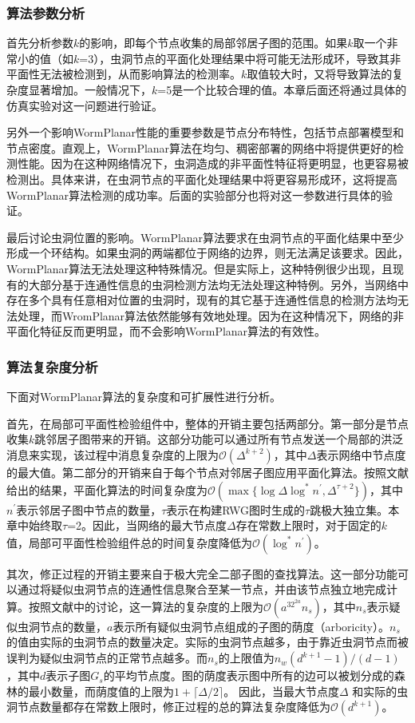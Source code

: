 \subsubsection{算法参数分析}
首先分析参数$k$的影响，即每个节点收集的局部邻居子图的范围。如果$k$取一个非常小的值（如$k$=3），虫洞节点的平面化处理结果中将可能无法形成环，导致其非平面性无法被检测到，从而影响算法的检测率。$k$取值较大时，又将导致算法的复杂度显著增加。一般情况下，$k$=5是一个比较合理的值。本章后面还将通过具体的仿真实验对这一问题进行验证。

另外一个影响WormPlanar性能的重要参数是节点分布特性，包括节点部署模型和节点密度。直观上，WormPlanar算法在均匀、稠密部署的网络中将提供更好的检测性能。因为在这种网络情况下，虫洞造成的非平面性特征将更明显，也更容易被检测出。具体来讲，在虫洞节点的平面化处理结果中将更容易形成环，这将提高WormPlanar算法检测的成功率。后面的实验部分也将对这一参数进行具体的验证。

最后讨论虫洞位置的影响。WormPlanar算法要求在虫洞节点的平面化结果中至少形成一个环结构。如果虫洞的两端都位于网络的边界，则无法满足该要求。因此，WormPlanar算法无法处理这种特殊情况。但是实际上，这种特例很少出现，且现有的大部分基于连通性信息的虫洞检测方法均无法处理这种特例。另外，当网络中存在多个具有任意相对位置的虫洞时，现有的其它基于连通性信息的检测方法均无法处理，而WromPlanar算法依然能够有效地处理。因为在这种情况下，网络的非平面化特征反而更明显，而不会影响WormPlanar算法的有效性。

\subsubsection{算法复杂度分析}
下面对WormPlanar算法的复杂度和可扩展性进行分析。

首先，在局部可平面性检验组件中，整体的开销主要包括两部分。第一部分是节点收集$k$跳邻居子图带来的开销。这部分功能可以通过所有节点发送一个局部的洪泛消息来实现，该过程中消息复杂度的上限为$\mathcal{O}(\Delta^{k+2})$，其中$\Delta$表示网络中节点度的最大值。第二部分的开销来自于每个节点对邻居子图应用平面化算法。按照文献给出的结果，平面化算法的时间复杂度为$\mathcal{O}(\max\{\log\Delta\log^*n^{'},\Delta^{\tau+2}\})$，其中$n^{'}$表示邻居子图中节点的数量，$\tau$表示在构建RWG图时生成的$\tau$跳极大独立集。本章中始终取$\tau$=2。因此，当网络的最大节点度$\Delta$存在常数上限时，对于固定的$k$值，局部可平面性检验组件总的时间复杂度降低为$\mathcal{O}(\log^*n^{'})$。

其次，修正过程的开销主要来自于极大完全二部子图的查找算法。这一部分功能可以通过将疑似虫洞节点的连通性信息聚合至某一节点，并由该节点独立地完成计算。按照文献中的讨论，这一算法的复杂度的上限为$\mathcal{O}(a^32^{2a}n_s)$，其中$n_s$表示疑似虫洞节点的数量，$a$表示所有疑似虫洞节点组成的子图的荫度（arboricity）。$n_s$的值由实际的虫洞节点的数量决定。实际的虫洞节点越多，由于靠近虫洞节点而被误判为疑似虫洞节点的正常节点越多。而$n_s$的上限值为$n_w(d^{k+1}-1)/(d-1)$，其中$d$表示子图$G_s$的平均节点度。图的荫度表示图中所有的边可以被划分成的森林的最小数量，而荫度值的上限为$1+\lceil\Delta/2\rceil$。 因此，当最大节点度$\Delta$ 和实际的虫洞节点数量都存在常数上限时，修正过程的总的算法复杂度降低为$\mathcal{O}(d^{k+1})$。

